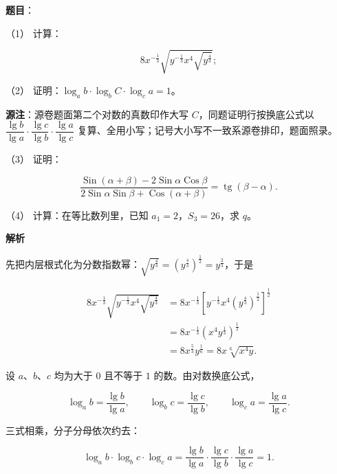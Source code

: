 \begin{answer}

\textbf{题目}：

（1） 计算：

\nopagebreak[4]
\[
8x^{-\frac13}\sqrt{y^{-\frac13}x^4\sqrt{y^{\frac43}}};
\]

（2） 证明：$\log_a b\cdot\log_b C\cdot\log_c a=1$。

\begin{gktip}
\textbf{源注}：源卷题面第二个对数的真数印作大写 $C$，同题证明行按换底公式以 $\dfrac{\lg b}{\lg a}\cdot\dfrac{\lg c}{\lg b}\cdot\dfrac{\lg a}{\lg c}$ 复算、全用小写；记号大小写不一致系源卷排印，题面照录。
\end{gktip}

（3） 证明：

\nopagebreak[4]
\[
\frac{\operatorname{Sin}(\alpha+\beta)-2\operatorname{Sin}\alpha\operatorname{Cos}\beta}
{2\operatorname{Sin}\alpha\operatorname{Sin}\beta+\operatorname{Cos}(\alpha+\beta)}
=\operatorname{tg}(\beta-\alpha).
\]

（4） 计算：在等比数列里，已知 $a_1=2$，$S_3=26$，求 $q$。

\textbf{解析}


先把内层根式化为分数指数幂：$\sqrt{y^{\frac43}}=\left(y^{\frac43}\right)^{\frac12}=y^{\frac23}$，于是

\nopagebreak[4]
\[
\begin{aligned}
8x^{-\frac13}\sqrt{y^{-\frac13}x^4\sqrt{y^{\frac43}}}
&=8x^{-\frac13}\left[y^{-\frac13}x^4\left(y^{\frac43}\right)^{\frac12}\right]^{\frac12}\\
&=8x^{-\frac13}\left(x^4y^{\frac13}\right)^{\frac12}\\
&=8x^{\frac53}y^{\frac16}
=8x\sqrt[6]{x^4y}.
\end{aligned}
\]


设 $a\text{、}b\text{、}c$ 均为大于 $0$ 且不等于 $1$ 的数。由对数换底公式，

\nopagebreak[4]
\[
\log_a b=\frac{\lg b}{\lg a},
\qquad
\log_b c=\frac{\lg c}{\lg b},
\qquad
\log_c a=\frac{\lg a}{\lg c}.
\]

三式相乘，分子分母依次约去：

\nopagebreak[4]
\[
\log_a b\cdot\log_b c\cdot\log_c a
=\frac{\lg b}{\lg a}\cdot\frac{\lg c}{\lg b}\cdot\frac{\lg a}{\lg c}
=1.
\]


\end{answer}
